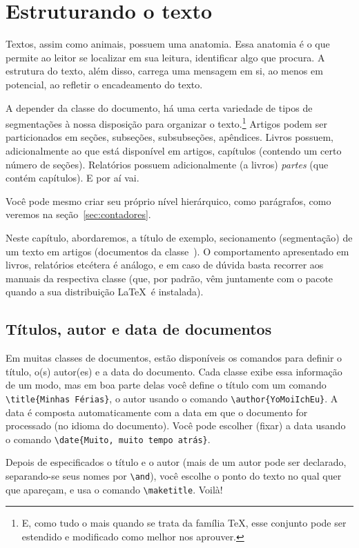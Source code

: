 \section{Estruturando o texto}

Textos, assim como animais, possuem uma anatomia. Essa anatomia é o que permite ao leitor se localizar em sua leitura, identificar algo que procura. A estrutura do texto, além disso, carrega uma mensagem em si, ao menos em potencial, ao refletir o encadeamento do texto.

A depender da classe do documento, há uma certa variedade de tipos de segmentações à nossa disposição para organizar o texto.\footnote{E, como tudo o mais quando se trata da família \TeX, esse conjunto pode ser estendido e modificado como melhor nos aprouver.}
Artigos podem ser particionados em seções, subseções, subsubseções, apêndices.
Livros possuem, adicionalmente ao que está disponível em artigos, capítulos (contendo um certo número de seções).
Relatórios possuem adicionalmente (a livros) \emph{partes} (que contém capítulos).
E por aí vai.

Você pode mesmo criar seu próprio nível hierárquico, como parágrafos, como veremos na seção~\ref{sec:contadores}.

Neste capítulo, abordaremos, a título de exemplo, secionamento (segmentação) de um texto em artigos (documentos da classe~). O comportamento apresentado em livros, relatórios etcétera é análogo, e em caso de dúvida basta recorrer aos manuais da respectiva classe (que, por padrão, vêm juntamente com o pacote quando a sua distribuição \LaTeX\ é instalada).

\subsection{Títulos, autor e data de documentos}

Em muitas classes de documentos, estão disponíveis os comandos para
definir o título, o(s) autor(es) e a data do documento. Cada classe
exibe essa informação de um modo, mas em boa parte delas você define o
título com um comando \verb'\title{Minhas Férias}', o autor usando o
comando \verb'\author{YoMoiIchEu}'. A data é composta automaticamente
com a data em que o documento for processado (no idioma do
documento). Você pode escolher (fixar) a data usando o comando
\verb'\date{Muito, muito tempo atrás}'.

Depois de especificados o título e o autor (mais de um autor pode ser
declarado, separando-se seus nomes por \verb'\and'), você escolhe o
ponto do texto no qual quer que apareçam, e usa o comando
\verb'\maketitle'. Voilà!

